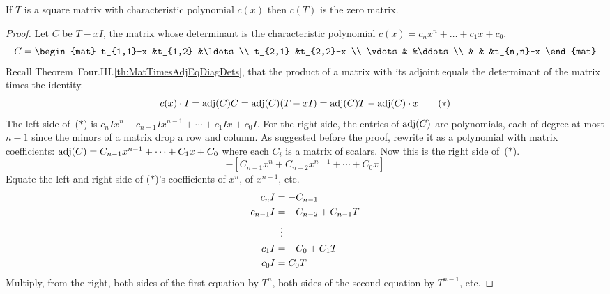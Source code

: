 \begin{lemma}   \label{le:MatSatItsCharPoly}
If \( T \) is a square matrix with characteristic polynomial \( c(x) \)
then \( c(T) \) is the zero matrix.
\end{lemma}

\begin{proof}
Let \( C \) be \( T-xI \),
the matrix whose determinant is the characteristic polynomial
\( c(x)=c_nx^n+\dots+c_1x+c_0 \).
\begin{equation*}
  C=\begin{mat}
    t_{1,1}-x        &t_{1,2}   &\ldots        \\
    t_{2,1}          &t_{2,2}-x               \\
    \vdots           &          &\ddots       \\
                     &          &       &t_{n,n}-x
  \end{mat}
\end{equation*}
Recall Theorem~Four.III.\ref{th:MatTimesAdjEqDiagDets},
that the product of a matrix with its adjoint equals
the determinant of the matrix times the identity.
\begin{equation*}
  c(x)\cdot I
  =\operatorname{adj} (C)C
  =\operatorname{adj} (C)(T-xI)
  =\operatorname{adj} (C)T- \operatorname{adj}(C)\cdot x
\tag*{($*$)}
\end{equation*}
The left side of~($*$) is 
$c_nIx^n+c_{n-1}Ix^{n-1}+\cdots+c_1Ix+c_0I$.
For the right side,
the entries of \( \operatorname{adj} (C) \) are polynomials, each of degree
at most \( n-1 \) since the minors of a matrix drop a row and column.
As suggested before the proof, rewrite it as a polynomial with
matrix coefficients:
\( \operatorname{adj} (C)=C_{n-1}x^{n-1}+\cdots+C_1x+C_0 \)
where each \( C_i \) is a matrix of scalars.
Now this is the right side of~($*$).
\begin{equation*}
  [(C_{n-1}T)x^{n-1}+\cdots+(C_1T)x+C_0T]  
   -[C_{n-1}x^n+C_{n-2}x^{n-1}+\cdots+C_0x]
\end{equation*}
Equate the left and right side of ($*$)'s
coefficients of \( x^n \), of $x^{n-1}$, etc.
\begin{align*}
  c_nI
  &=-C_{n-1}    \\
  c_{n-1}I
  &=-C_{n-2}+C_{n-1}T    \\
  &\vdotswithin{=}             \\
  c_{1}I
  &=-C_{0}+C_{1}T    \\
  c_{0}I
  &=C_{0}T
\end{align*}
Multiply, from the right, both sides of the first equation by \( T^n \), 
both sides of the second equation by \( T^{n-1} \), etc.

\end{proof}
